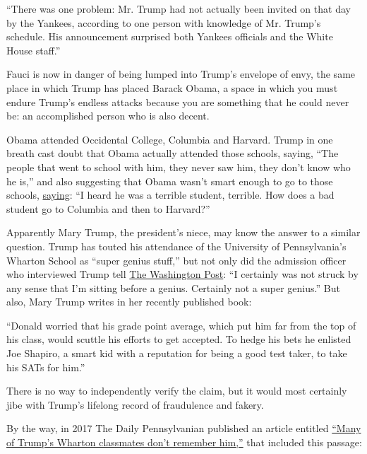 ``There was one problem: Mr. Trump had not actually been invited on that
day by the Yankees, according to one person with knowledge of Mr.
Trump's schedule. His announcement surprised both Yankees officials and
the White House staff.''

Fauci is now in danger of being lumped into Trump's envelope of envy,
the same place in which Trump has placed Barack Obama, a space in which
you must endure Trump's endless attacks because you are something that
he could never be: an accomplished person who is also decent.

Obama attended Occidental College, Columbia and Harvard. Trump in one
breath cast doubt that Obama actually attended those schools, saying,
``The people that went to school with him, they never saw him, they
don't know who he is,'' and also suggesting that Obama wasn't smart
enough to go to those schools,
\href{https://www.nbcnewyork.com/news/local/trump-obama-wasnt-good-enough-to-get-into-ivy-schools/1924291/}{saying}:
``I heard he was a terrible student, terrible. How does a bad student go
to Columbia and then to Harvard?''

Apparently Mary Trump, the president's niece, may know the answer to a
similar question. Trump has touted his attendance of the University of
Pennsylvania's Wharton School as ``super genius stuff,'' but not only
did the admission officer who interviewed Trump tell
\href{https://www.washingtonpost.com/politics/trump-who-often-boasts-of-his-wharton-degree-says-he-was-admitted-to-the-hardest-school-to-get-into-the-college-official-who-reviewed-his-application-recalls-it-differently/2019/07/08/0a4eb414-977a-11e9-830a-21b9b36b64ad_story.html}{The
Washington Post}: ``I certainly was not struck by any sense that I'm
sitting before a genius. Certainly not a super genius.'' But also, Mary
Trump writes in her recently published book:

``Donald worried that his grade point average, which put him far from
the top of his class, would scuttle his efforts to get accepted. To
hedge his bets he enlisted Joe Shapiro, a smart kid with a reputation
for being a good test taker, to take his SATs for him.''

There is no way to independently verify the claim, but it would most
certainly jibe with Trump's lifelong record of fraudulence and fakery.

By the way, in 2017 The Daily Pennsylvanian published an article
entitled
\href{https://www.thedp.com/article/2017/02/trump-classmates-wharton-academics}{``Many
of Trump's Wharton classmates don't remember him,''} that included this
passage:

